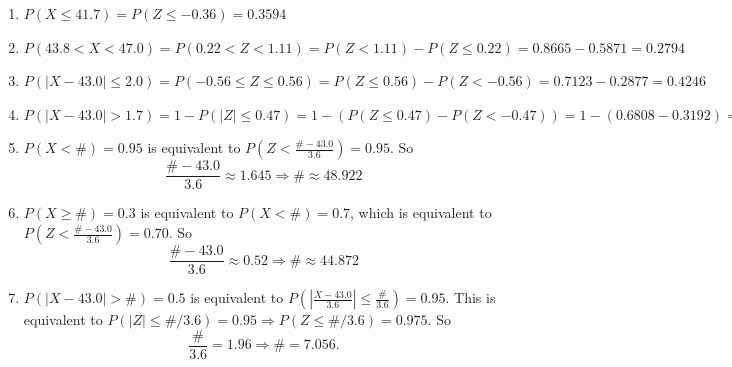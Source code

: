 \documentclass{article}\usepackage[]{graphicx}\usepackage[]{color}
\begin{document}
\begin{enumerate}
\begin{enumerate}
	\item $P(X \leq 41.7) = P(Z \leq -0.36) = 0.3594$
	
	\item $P(43.8 < X < 47.0) = P(0.22 < Z < 1.11) = P(Z < 1.11) - P(Z \leq 0.22) = 0.8665 - 0.5871 = 0.2794$
	
	\item $P(|X - 43.0| \leq 2.0) = P(-0.56 \leq Z \leq 0.56) = P(Z \leq 0.56) - P(Z < -0.56) = 0.7123 - 0.2877 = 0.4246$
	
	\item $P(|X - 43.0| > 1.7) = 1 - P(|Z| \leq 0.47) = 1 - (P(Z \leq 0.47) - P(Z < -0.47)) = 1 - (0.6808 - 0.3192) = 0.6384$
	
	\item $P(X < \#) = 0.95$ is equivalent to $P(Z < \frac{\# - 43.0}{3.6}) = 0.95$. So 
	\[\frac{\# - 43.0}{3.6} \approx 1.645 \Rightarrow \# \approx 48.922\]
	
	\item $P(X \geq \#) = 0.3$ is equivalent to $P(X < \#) = 0.7$, which is equivalent to $P(Z < \frac{\# - 43.0}{3.6}) = 0.70$. So
	\[\frac{\# - 43.0}{3.6} \approx 0.52 \Rightarrow \# \approx 44.872\]
	
	\item $P(|X - 43.0| > \#) = 0.5$ is equivalent to $P(|\frac{X - 43.0}{3.6}| \leq \frac{\#}{3.6}) = 0.95$. This is equivalent to $P(|Z| \leq \#/3.6) = 0.95 \Rightarrow P(Z \leq \#/3.6) = 0.975$. So
	\[\frac{\#}{3.6} = 1.96 \Rightarrow \# = 7.056.\]
  
	\end{enumerate}
\end{enumerate}
% 
%
\end{document}
